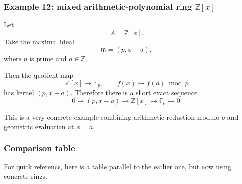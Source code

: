 \documentclass[12pt,a4paper]{article}
\theoremstyle{notespace}
\newcommand{\mf}{\mathfrak}
\theoremstyle{definition}
\begin{document}
\subsubsection{Example 12: mixed arithmetic-polynomial ring \(\mathbb Z[x]\)}

Let
\[
A=\mathbb Z[x].
\]
Take the maximal ideal
\[
\mf m=(p,x-a),
\]
where \(p\) is prime and \(a\in \mathbb Z\).

Then the quotient map
\[
\mathbb Z[x]\longrightarrow \mathbb F_p,
\qquad
f(x)\longmapsto f(a)\bmod p
\]
has kernel \((p,x-a)\). Therefore there is a short exact sequence
\[
0 \longrightarrow (p,x-a)
\longrightarrow
\mathbb Z[x]
\longrightarrow
\mathbb F_p
\longrightarrow 0.
\]

This is a very concrete example combining arithmetic reduction modulo \(p\) and geometric evaluation at \(x=a\).

\subsubsection{Comparison table}

For quick reference, here is a table parallel to the earlier one, but now using concrete rings.
\end{document}
